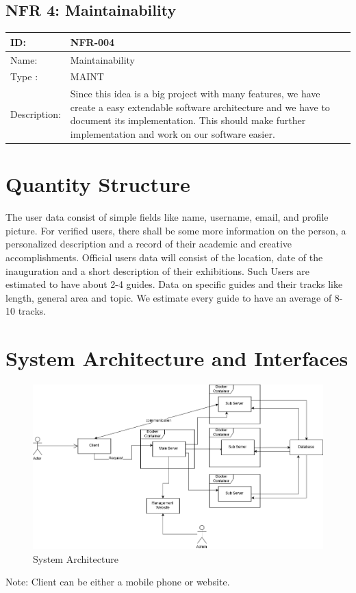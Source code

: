 \documentclass[12pt]{article}
\theoremstyle{definition}
\newenvironment{text}{
   \setlength{\parindent}{0pt}
   \color{black}
}{}
\begin{document}
\subsection{NFR 4: Maintainability}
\begin{tabular}{|p{.2\linewidth}|p{.65\linewidth}|}
\hline 
ID: & NFR-004 \\ \hline
Name: & Maintainability \\ \hline
Type    : & MAINT \\ \hline
Description: & Since this idea is a big project with many features, we have create a easy extendable software architecture and we have to document its implementation. This should make further implementation and work on our software easier. \\ \hline
\end{tabular}

\pagebreak

\section{Quantity Structure}

\begin{text}
The user data consist of simple fields like name, username, email, and profile picture. For verified users, there shall be some more information on the person, a personalized description and a record of their academic and creative accomplishments. Official users data will consist of the location, date of the inauguration and a short description of their exhibitions. Such Users are estimated to have about 2-4 guides. Data on specific guides and their tracks like length, general area and topic. We estimate every guide to have an average of 8-10 tracks. 
\end{text}

\pagebreak
\section{System Architecture and Interfaces}
    \begin{figure}[hbt!]
        \centering
        \includegraphics[width=1\linewidth]{Architecture/SysArchitecture.png}
        \caption{System Architecture}
        \label{fig:sysarch}
    \end{figure}
    \begin{text}
    Note: Client can be either a mobile phone or website.
    \end{text}    
\end{document}
